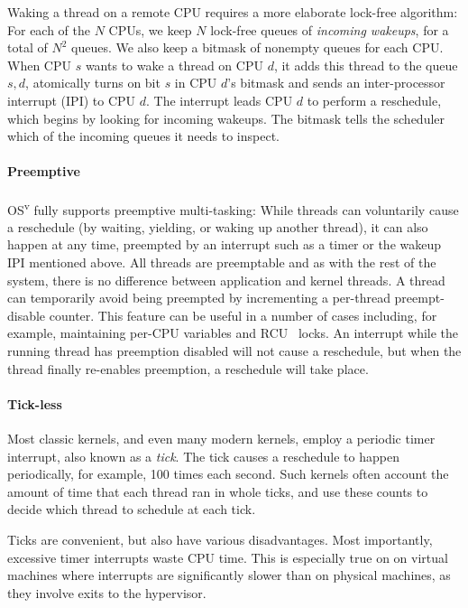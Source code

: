 \documentclass{sig-alternate}
\begin{document}
Waking a thread on a remote CPU requires a more elaborate lock-free algorithm:
For each of the $N$ CPUs, we keep $N$ lock-free queues of \emph{incoming
wakeups}, for a total of $N^2$ queues. We also keep a
bitmask of nonempty queues for each CPU. When CPU $s$ wants to wake a thread
on CPU $d$, it adds this thread to the queue $s,d$, atomically turns on bit $s$ in CPU $d$'s bitmask
and sends an inter-processor interrupt (IPI) to CPU $d$.
The interrupt leads CPU $d$ to perform a reschedule, which begins by looking
for incoming wakeups. The bitmask tells the scheduler which of the incoming queues
it needs to inspect.

\paragraph{Preemptive} OS\textsuperscript{v} fully supports preemptive multi-tasking:
While threads can voluntarily cause a reschedule (by waiting, yielding, or 
waking up another thread), it can also happen at any time, preempted
by an interrupt such as a timer or the wakeup IPI mentioned above.
All threads are preemptable and as with the rest of the system, there is no difference between application 
and kernel threads. A thread can temporarily avoid being preempted by
incrementing a per-thread preempt-disable counter. This feature can
be useful in a number of cases including, for example, maintaining per-CPU
variables and RCU~\cite{RCU} locks. An interrupt while the running thread 
has preemption disabled will not cause a reschedule, but when the thread
finally re-enables preemption, a reschedule will take place.


\paragraph{Tick-less}
Most classic kernels, and even many modern kernels, employ a periodic timer
interrupt, also known as a \emph{tick}. The tick causes a reschedule to happen periodically,
for example, 100 times each second. Such kernels often account the amount of time that
each thread ran in whole ticks, and use these counts to decide which thread
to schedule at each tick.

Ticks are convenient, but also have various disadvantages. Most importantly,
excessive timer interrupts waste CPU time. This is especially true on
on virtual machines where interrupts are significantly slower than on
physical machines, as they involve exits to the hypervisor.
\end{document}
